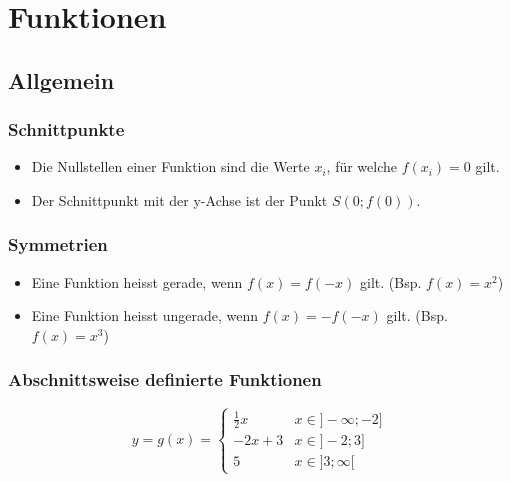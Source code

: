 \documentclass[12pt]{scrartcl}
\begin{document}
\newpage

\section{Funktionen}
\subsection{Allgemein}
\subsubsection{Schnittpunkte}
\begin{itemize}
    \item Die Nullstellen einer Funktion sind die Werte $x_i$, für welche $f(x_i) = 0$ gilt.
    \item Der Schnittpunkt mit der y-Achse ist der Punkt $S(0; f(0))$.
\end{itemize}

\subsubsection{Symmetrien}

\begin{itemize}
    \item Eine Funktion heisst gerade, wenn $f(x) = f(-x)$ gilt. (Bsp. $f(x) = x^2$)
    \item Eine Funktion heisst ungerade, wenn $f(x) = -f(-x)$ gilt. (Bsp. $f(x) = x^3$)
\end{itemize}

\subsubsection{Abschnittsweise definierte Funktionen}

\[ y = g(x) = 
    \begin{cases} 
    \frac{1}{2}x    & x \in ]-\infty; -2] \\
    -2x+3           & x \in ]-2; 3]\\
    5               & x \in ]3;\infty[
 \end{cases}
\]

\end{document}
